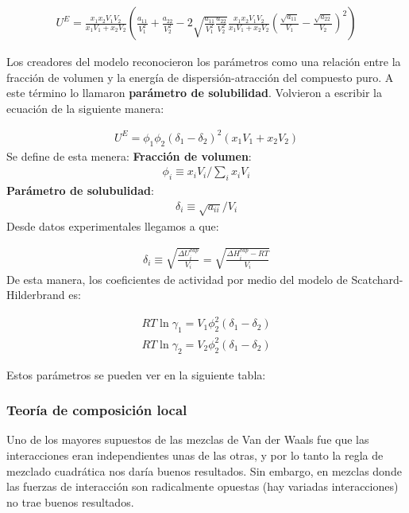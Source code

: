 \begin{align}
    U^{E}=\frac{x_{1} x_{2} V_{1} V_{2}}{x_{1} V_{1}+x_{2} V_{2}}\left(\frac{a_{11}}{V_{1}^{2}}+\frac{a_{22}}{V_{2}^{2}}-2 \sqrt{\frac{a_{11}}{V_{1}^{2}} \frac{a_{22}}{V_{2}^{2}}} \frac{x_{1} x_{2} V_{1} V_{2}}{x_{1} V_{1}+x_{2} V_{2}}\left(\frac{\sqrt{a_{11}}}{V_{1}}-\frac{\sqrt{a_{22}}}{V_{2}}\right)^{2}\right)
\end{align}

Los creadores del modelo reconocieron los parámetros como una relación entre la fracción de volumen y la energía de dispersión-atracción del compuesto puro. A este término lo llamaron \textbf{parámetro de solubilidad}. Volvieron a escribir la ecuación de la siguiente manera:

\begin{align}
    U^{E}=\phi_1\phi_2(\delta_1-\delta_2)^2 (x_1V_1+x_2V_2)
\end{align}
Se define de esta menera:
\textbf{Fracción de volumen}:
\begin{align}
    \phi_i\equiv x_iV_i / \sum_i x_i V_i
\end{align}
\textbf{Parámetro de solubulidad}:
\begin{align}
    \delta_i\equiv \sqrt{a_{ii}}/V_i
\end{align}
Desde datos experimentales llegamos a que:

\begin{align}
    \delta_i\equiv \sqrt{\frac{\Delta U_i^{vap}}{V_i}}=\sqrt{\frac{\Delta H_i^{vap}-RT}{V_i}}
\end{align}
De esta manera, los coeficientes de actividad por medio del modelo de Scatchard-Hilderbrand es:

\begin{align}
    RT\ln \gamma_1 = V_1 \phi_2^2 (\delta_1-\delta_2)\\
    RT\ln \gamma_2 = V_2 \phi_2^2 (\delta_1-\delta_2)
\end{align}

Estos parámetros se pueden ver en la siguiente tabla:


\subsubsection{Teoría de composición local}

Uno de los mayores supuestos de las mezclas de Van der Waals fue que las interacciones eran independientes unas de las otras, y por lo tanto la regla de mezclado cuadrática nos daría buenos resultados. 
Sin embargo, en mezclas donde las fuerzas de interacción son radicalmente opuestas (hay variadas interacciones) no trae buenos resultados.

